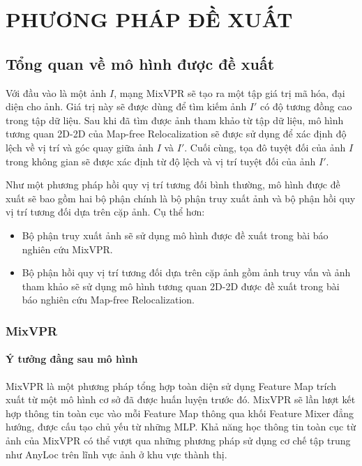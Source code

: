 \chapter{PHƯƠNG PHÁP ĐỀ XUẤT}

\section{Tổng quan về mô hình được đề xuất}
Với đầu vào là một ảnh $I$, mạng MixVPR sẽ tạo ra một tập giá trị mã hóa, đại diện cho ảnh. Giá trị này sẽ được dùng để tìm kiếm ảnh $I'$ có độ tương đồng cao trong tập dữ liệu. Sau khi đã tìm được ảnh tham khảo từ tập dữ liệu, mô hình tương quan 2D-2D của Map-free Relocalization sẽ được sử dụng để xác định độ lệch về vị trí và góc quay giữa ảnh $I$ và $I'$. Cuối cùng, tọa đô tuyệt đối của ảnh $I$ trong không gian sẽ được xác định từ độ lệch và vị trí tuyệt đối của ảnh $I'$.

Như một phương pháp hồi quy vị trí tương đối bình thường, mô hình được đề xuất sẽ bao gồm hai bộ phận chính là bộ phận truy xuất ảnh và bộ phận hồi quy vị trí tương đối dựa trên cặp ảnh. Cụ thể hơn:
\begin{itemize}
    \item Bộ phận truy xuất ảnh sẽ sử dụng mô hình được đề xuất trong bài báo nghiên cứu MixVPR.
    \item Bộ phận hồi quy vị trí tương đối dựa trên cặp ảnh gồm ảnh truy vấn và ảnh tham khảo sẽ sử dụng mô hình tương quan 2D-2D được đề xuất trong bài báo nghiên cứu Map-free Relocalization.
\end{itemize}

\subsection{MixVPR \cite{alibey2023mixvpr}}
\subsubsection*{Ý tưởng đằng sau mô hình}
MixVPR là một phương pháp tổng hợp toàn diện sử dụng Feature Map trích xuất từ một mô hình cơ sở đã được huấn luyện trước đó. MixVPR sẽ lần lượt kết hợp thông tin toàn cục vào mỗi Feature Map thông qua khối Feature Mixer đẳng hướng, được cấu tạo chủ yếu từ những MLP. Khả năng học thông tin toàn cục từ ảnh của MixVPR có thể vượt qua những phương pháp sử dụng cơ chế tập trung như AnyLoc \cite{keetha2023anyloc} trên lĩnh vực ảnh ở khu vực thành thị.

